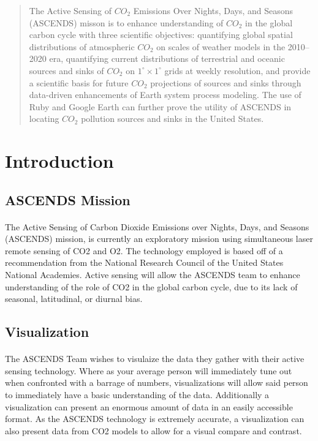 \documentclass[12pt,letterpaper]{report}
\begin{document}
 

 \begin{abstract}
The Active Sensing of $CO_2$ Emissions Over Nights, Days, and Seasons (ASCENDS) misson is to enhance understanding of $CO_2$ in the global carbon cycle with three scientific objectives: quantifying global spatial distributions of atmospheric $CO_2$ on scales of weather models in the 2010--2020 era, quantifying current distributions of terrestrial and oceanic sources and sinks of $CO_2$ on $1^\circ \times 1^\circ$ grids at weekly resolution, and provide a scientific basis for future $CO_2$ projections of sources and sinks through data-driven enhancements of Earth system process modeling.  The use of Ruby and Google Earth can further prove the utility of ASCENDS in locating $CO_2$ pollution sources and sinks in the United States.
 \end{abstract}

 \section*{Introduction}
  \subsection*{ASCENDS Mission}
   \paragraph{}
    The Active Sensing of Carbon Dioxide Emissions over Nights, Days, and Seasons (ASCENDS) mission, is currently an exploratory mission using simultaneous laser remote sensing of CO2 and O2. The technology employed is based off of a recommendation from the National Research Council of the United States National Academies. Active sensing will allow the ASCENDS team to enhance understanding of the role of CO2 in the global carbon cycle, due to its lack of seasonal, latitudinal, or diurnal bias.
  \subsection*{Visualization}
   \paragraph{}
    The ASCENDS Team wishes to visulaize the data they gather with their active sensing technology. Where as your average person will immediately tune out when confronted with a barrage of numbers, visualizations will allow said person to immediately have a basic understanding of the data. Additionally a visualization can present an enormous amount of data in an easily accessible format. As the ASCENDS technology is extremely accurate, a visualization can also present data from CO2 models to allow for a visual compare and contrast.
\end{document}
